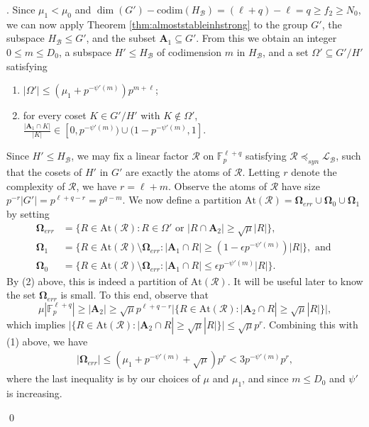 \documentclass[12pt,oneside,british,a4wide]{amsart}
\numberwithin{equation}{section}
\theoremstyle{definition}
\def\F{\mathbb{F}}
\def\e{\epsilon}
\newcommand{\calL}{\mathcal{L}}
\newcommand{\calB}{\mathcal{B}}
\newcommand{\calR}{\mathcal{R}}
\newcommand{\codim}{{\mathrm{codim}}}
\newcommand{\At}{{\mathrm{At}}}
\newenvironment{proofof}[1]{\indent{\itshape Proof of #1}.\;}{\qed}
\begin{document}
\begin{proofof}{Theorem \ref{thm:fop}}
Since $\mu_1<\mu_0$ and $\dim(G')-\codim(H_{\calB})=(\ell+q)-\ell=q\geq f_2\geq N_0$, we can now apply Theorem \ref{thm:almoststableinhstrong} to the group $G'$, the subspace $H_{\calB}\leq G'$, and the subset $\mathbf{A}_1\subseteq G'$.  From this we obtain an integer $0\leq m\leq D_0$, a subspace $H'\leq H_{\calB}$ of codimension $m$ in $H_{\calB}$, and a set $\Omega'\subseteq G'/H'$ satisfying
\begin{enumerate}[label=\normalfont(\arabic*)]
\item  $|\Omega'|\leq (\mu_1+p^{-\psi'(m)})p^{m+\ell}$;
\item for every coset $K\in G'/H'$ with $K\notin \Omega'$, $\frac{|\mathbf{A}_1\cap K|}{|K|}\in [0,p^{-\psi'(m)})\cup (1-p^{-\psi'(m)},1]$.   
\end{enumerate}
Since $H'\leq H_{\calB}$, we may fix a linear factor $\calR$ on $\F_p^{\ell+q}$ satisfying $\calR\preceq_{syn}\calL_{\calB}$, such that the cosets of $H'$ in $G'$ are exactly the atoms of $\calR$.   Letting $r$ denote the complexity of $\calR$, we have  $r=\ell+m$.   Observe the atoms of $\calR$ have size $p^{-r}|G'|=p^{\ell+q-r}=p^{q-m}$.  We now define a partition $\At(\calR)=\mathbf{\Omega}_{err}\cup \mathbf{\Omega}_0\cup \mathbf{\Omega}_1$ by setting 
\begin{align*}
\mathbf{\Omega}_{err}&=\{R\in \At(\calR): R\in \Omega'\text{ or }|R\cap \mathbf{A}_2|\geq \sqrt{\mu}|R|\},\\   
\mathbf{\Omega}_1&=\{R\in \At(\calR)\setminus \mathbf{\Omega}_{err}: |\mathbf{A}_1\cap R| \geq (1- \e p^{-\psi'(m)})|R|\},\text{ and }\\
\mathbf{\Omega}_0&=\{R\in \At(\calR)\setminus \mathbf{\Omega}_{err}: |\mathbf{A}_1\cap R| \leq  \e p^{-\psi'(m)}|R|\}. 
\end{align*}
By (2) above, this is indeed a partition of $\At(\calR)$. It will be useful later to know the set $\mathbf{\Omega}_{err}$ is small. To this end, observe that
$$
\mu |\F_p^{\ell+q}|\geq |\mathbf{A}_2|\geq \sqrt{\mu}p^{\ell+q-r}|\{R\in \At(\calR): |\mathbf{A}_2\cap R|\geq \sqrt{\mu}|R|\}|, 
$$
which implies $|\{R\in \At(\calR): |\mathbf{A}_2\cap R|\geq \sqrt{\mu}|R|\}|\leq \sqrt{\mu}p^r$.   Combining this with (1) above, we have 
\begin{align}\label{omegabd}
 |\mathbf{\Omega}_{err}|\leq (\mu_1+p^{-\psi'(m)}+\sqrt{\mu})p^r<3p^{-\psi'(m)}p^r,
\end{align}
where the last inequality is by our choices of $\mu$ and $\mu_1$, and since $m\leq D_0$ and $\psi'$ is increasing. 



\end{proofof}
\end{document}
